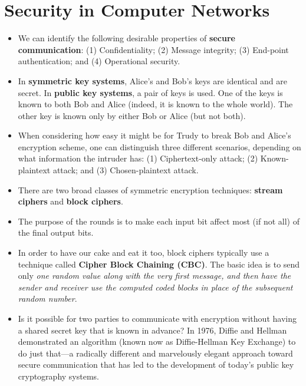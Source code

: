 \section{Security in Computer Networks}
\begin{itemize}

\item
We can identify the following desirable properties of \textbf{secure communication}: (1) Confidentiality; (2) Message integrity; (3) End-point authentication; and (4) Operational security.

\item
In \textbf{symmetric key systems}, Alice's and Bob's keys are identical and are secret. In \textbf{public key systems}, a pair of keys is used. One of the keys is known to both Bob and Alice (indeed, it is known to the whole world). The other key is known only by either Bob or Alice (but not both).

\item
When considering how easy it might be for Trudy to break Bob and Alice's encryption scheme, one can distinguish three different scenarios, depending on what information the intruder has: (1) Ciphertext-only attack; (2) Known-plaintext attack; and (3) Chosen-plaintext attack.

\item
There are two broad classes of symmetric encryption techniques: \textbf{stream ciphers} and \textbf{block ciphers}.

\item
The purpose of the rounds is to make each input bit affect most (if not all) of the final output bits.

\item
In order to have our cake and eat it too, block ciphers typically use a technique called \textbf{Cipher Block Chaining (CBC)}. The basic idea is to send only \textit{one random value along with the very first message, and then have the sender and receiver use the computed coded blocks in place of the subsequent random number}.

\item
Is it possible for two parties to communicate with encryption without having a shared secret key that is known in advance? In 1976, Diffie and Hellman demonstrated an algorithm (known now as Diffie-Hellman Key Exchange) to do just that---a radically different and marvelously elegant approach toward secure communication that has led to the development of today's public key cryptography systems.


\end{itemize}
